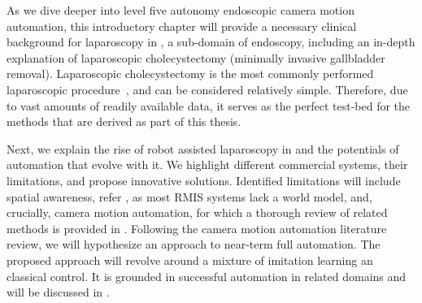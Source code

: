 As we dive deeper into level five autonomy endoscopic camera motion automation, this introductory chapter will provide a necessary clinical background for laparoscopy in , a sub-domain of endoscopy, including an in-depth explanation of laparoscopic cholecystectomy (minimally invasive gallbladder removal). Laparoscopic cholecystectomy is the most commonly performed laparoscopic procedure~\cite{sheetz2020trends}, and can be considered relatively simple. Therefore, due to vast amounts of readily available data, it serves as the perfect test-bed for the methods that are derived as part of this thesis. 

Next, we explain the rise of robot assisted laparoscopy in  and the potentials of automation that evolve with it. We highlight different commercial systems, their limitations, and propose innovative solutions. Identified limitations will include spatial awareness, refer , as most RMIS systems lack a world model, and, crucially, camera motion automation, for which a thorough review of related methods is provided in . Following the camera motion automation literature review, we will hypothesize an approach to near-term full automation. The proposed approach will revolve around a mixture of imitation learning an classical control. It is grounded in successful automation in related domains and will be discussed in .

